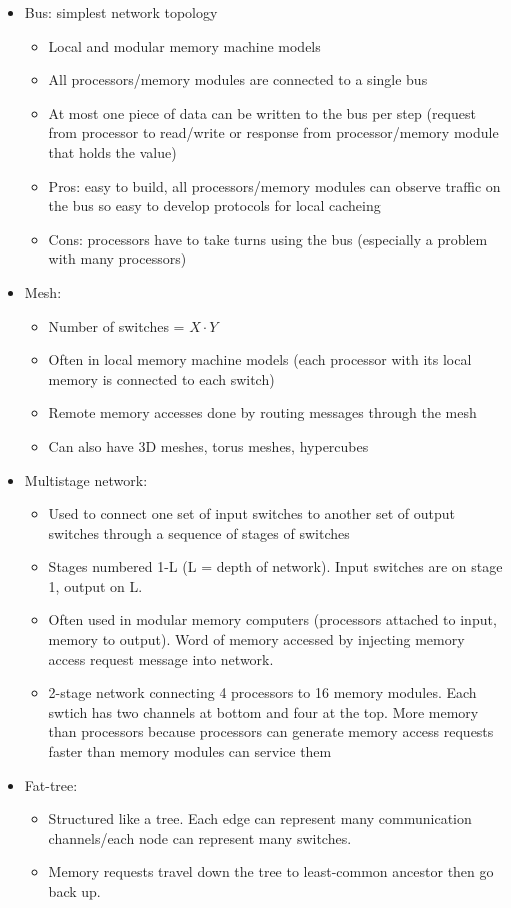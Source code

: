 \begin{itemize}
    \item Bus: simplest network topology
    \begin{itemize}
        \item Local and modular memory machine models
        \item All processors/memory modules are connected to a single bus
        \item At most one piece of data can be written to the bus per step (request from processor to read/write or response from processor/memory module that holds the value)
        \item Pros: easy to build, all processors/memory modules can observe traffic on the bus so easy to develop protocols for local cacheing
        \item Cons: processors have to take turns using the bus (especially a problem with many processors)
    \end{itemize}
    \item Mesh:
    \begin{itemize}
        \item Number of switches = $X \cdot Y$
        \item Often in local memory machine models (each processor with its local memory is connected to each switch)
        \item Remote memory accesses done by routing messages through the mesh
        \item Can also have 3D meshes, torus meshes, hypercubes
    \end{itemize}
    \item Multistage network:
    \begin{itemize}
        \item Used to connect one set of input switches to another set of output switches through a sequence of stages of switches
        \item Stages numbered 1-L (L = depth of network). Input switches are on stage 1, output on L. 
        \item Often used in modular memory computers (processors attached to input, memory to output). Word of memory accessed by injecting memory access request message into network.
        \item 2-stage network connecting 4 processors to 16 memory modules. Each swtich has two channels at bottom and four at the top. More memory than processors because processors can generate memory access requests faster than memory modules can service them
    \end{itemize}
    \item Fat-tree:
    \begin{itemize}
        \item Structured like a tree. Each edge can represent many communication channels/each node can represent many switches. 
        \item Memory requests travel down the tree to least-common ancestor then go back up. 
    \end{itemize}
\end{itemize}


